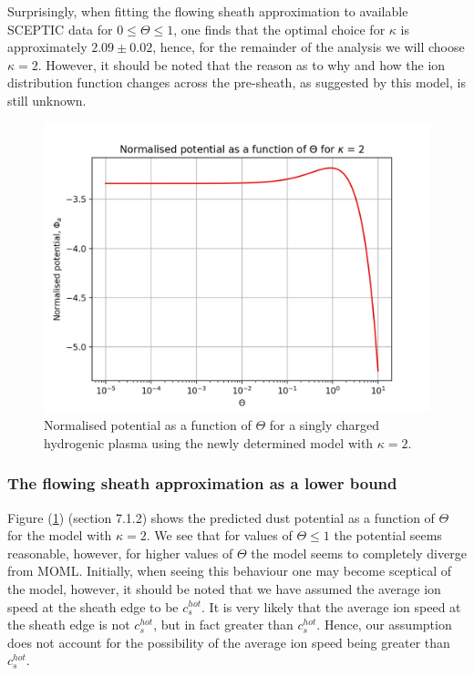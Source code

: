 \documentclass{article}
\begin{document}
\medskip 

Surprisingly, when fitting the flowing sheath approximation to available SCEPTIC data for $0 \leq \Theta \leq 1$, one finds that
the optimal choice for $\kappa$ is approximately $2.09 \pm 0.02$, hence, for the remainder of the analysis we will choose $\kappa = 2$. However, it should be noted that the reason as to why and how 
the ion distribution function changes across the pre-sheath, as suggested by this model, is still unknown.

\begin{figure}[H]
\centering
\includegraphics[width=\linewidth]{Output/FSpotential.jpeg}
\caption{Normalised potential as a function of $\Theta$ for a singly charged hydrogenic plasma
using the newly determined model with $\kappa = 2$.}
\label{FSpotential} 
\end{figure}

\subsubsection{The flowing sheath approximation as a lower bound}
\medskip

Figure (\ref{FSpotential}) (section 7.1.2) shows the predicted dust potential as a function of $\Theta$ for 
the model with $\kappa = 2$. We see that for values of $\Theta \leq 1$ the potential seems reasonable, however, for higher
values of $\Theta$ the model seems to completely diverge from MOML. Initially, when seeing this behaviour 
one may become sceptical of the model, however, it should be noted that we have assumed the average ion speed at
the sheath edge to be $c_s^{hot}$. It is very likely that the average ion
speed at the sheath edge is not $c_s^{hot}$, but in fact greater than $c_s^{hot}$. Hence, our assumption does not account for the possibility of the average ion 
speed being greater than $c_s^{hot}$. 
\end{document}
